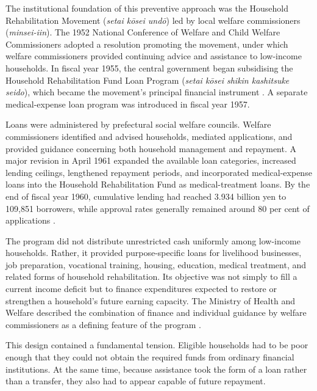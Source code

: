 \documentclass[12pt,a4paper]{article}
\begin{document}
The institutional foundation of this preventive approach was the Household Rehabilitation Movement (\emph{setai k\=osei und\=o}) led by local welfare commissioners (\emph{minsei-iin}). The 1952 National Conference of Welfare and Child Welfare Commissioners adopted a resolution promoting the movement, under which welfare commissioners provided continuing advice and assistance to low-income households. In fiscal year 1955, the central government began subsidising the Household Rehabilitation Fund Loan Program (\emph{setai k\=osei shikin kashitsuke seido}), which became the movement's principal financial instrument \citep{MinistryofHealthandWelfare1958}. A separate medical-expense loan program was introduced in fiscal year 1957.

Loans were administered by prefectural social welfare councils. Welfare commissioners identified and advised households, mediated applications, and provided guidance concerning both household management and repayment. A major revision in April 1961 expanded the available loan categories, increased lending ceilings, lengthened repayment periods, and incorporated medical-expense loans into the Household Rehabilitation Fund as medical-treatment loans. By the end of fiscal year 1960, cumulative lending had reached 3.934 billion yen to 109,851 borrowers, while approval rates generally remained around 80 per cent of applications \citep{MinistryofHealthandWelfare1961}.

The program did not distribute unrestricted cash uniformly among low-income households. Rather, it provided purpose-specific loans for livelihood businesses, job preparation, vocational training, housing, education, medical treatment, and related forms of household rehabilitation. Its objective was not simply to fill a current income deficit but to finance expenditures expected to restore or strengthen a household's future earning capacity. The Ministry of Health and Welfare described the combination of finance and individual guidance by welfare commissioners as a defining feature of the program \citep{MinistryofHealthandWelfare1964}.

This design contained a fundamental tension. Eligible households had to be poor enough that they could not obtain the required funds from ordinary financial institutions. At the same time, because assistance took the form of a loan rather than a transfer, they also had to appear capable of future repayment.
\end{document}
